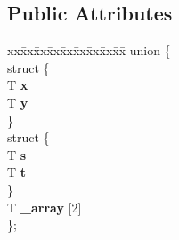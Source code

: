 \subsection*{Public Attributes}
\begin{DoxyCompactItemize}
\item 
\hypertarget{classnv_1_1vec2_a47919dfbe74f635507cd8ff2c33b06b6}{}\label{classnv_1_1vec2_a47919dfbe74f635507cd8ff2c33b06b6} 
\begin{tabbing}
xx\=xx\=xx\=xx\=xx\=xx\=xx\=xx\=xx\=\kill
union \{\\
\hypertarget{unionnv_1_1vec2_1_1_0D6_a17ad49d8b0b30563c9603deba0a7a5c6}{}\label{unionnv_1_1vec2_1_1_0D6_a17ad49d8b0b30563c9603deba0a7a5c6} 
\>struct \{\\
\>\>T {\bfseries x}\\
\>\>T {\bfseries y}\\
\>\} \\
\hypertarget{unionnv_1_1vec2_1_1_0D6_a90991bdf2785c8c92122eb7952496177}{}\label{unionnv_1_1vec2_1_1_0D6_a90991bdf2785c8c92122eb7952496177} 
\>struct \{\\
\>\>T {\bfseries s}\\
\>\>T {\bfseries t}\\
\>\} \\
\>T {\bfseries \_array} \mbox{[}2\mbox{]}\\
\}; \\

\end{tabbing}\end{DoxyCompactItemize}
